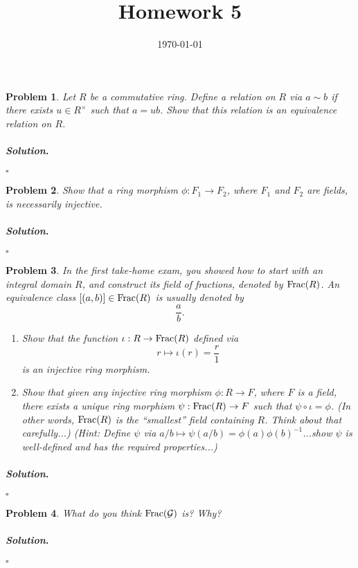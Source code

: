 \documentclass[reqno]{amsart}
\theoremstyle{plain}
\newtheorem{problem}{Problem}
\theoremstyle{definition}
\newenvironment{solution}{\paragraph{\emph{Solution}.}}{\hfill$\square$}
\begin{document}
 

\title[Homework 5]{Homework 5}

\date{\today} 
\maketitle 


\begin{problem}
Let $R$ be a commutative ring.  Define a relation on $R$ via $a \sim b$ if there exists $u \in R^{\times}$ such that $a = ub$.  Show that this relation is an equivalence relation on $R$.
\end{problem}
\begin{solution}

\end{solution}

\begin{problem}
Show that a ring morphism $\phi:F_{1} \rightarrow F_{2}$, where $F_{1}$ and $F_{2}$ are fields, is necessarily injective.
\end{problem}
\begin{solution}

\end{solution}

\begin{problem}
In the first take-home exam, you showed how to start with an integral domain $R$, and construct its field of fractions, denoted by ${\rm Frac}(R)$.  An equivalence class $[(a,b)] \in {\rm Frac}(R)$ is usually denoted by
$$\frac{a}{b}. $$
\begin{enumerate}
\item Show that the function $\iota:R \rightarrow {\rm Frac}(R)$ defined via
$$r \mapsto \iota(r) = \frac{r}{1} $$
is an injective ring morphism.
\item Show that given any injective ring morphism $\phi:R \rightarrow F$, where $F$ is a field, there exists a unique ring morphism $\psi:{\rm Frac}(R) \rightarrow F$ such that $\psi \circ \iota = \phi$.  (In other words, ${\rm Frac}(R)$ is the ``smallest'' field containing $R$.  Think about that carefully...) (Hint:  Define $\psi$ via $a/b \mapsto \psi(a/b) = \phi(a)\phi(b)^{-1}$...show $\psi$ is well-defined and has the required properties...)
\end{enumerate}
\end{problem}
\begin{solution}

\end{solution}

\begin{problem}
What do you think ${\rm Frac}(\mathcal{G})$ is?  Why?
\end{problem}
\begin{solution}

\end{solution}
\end{document}
